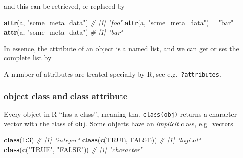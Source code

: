 \documentclass[]{book}
\newenvironment{Shaded}{\begin{snugshade}}{\end{snugshade}}
\newcommand{\CommentTok}[1]{\textcolor[rgb]{0.56,0.35,0.01}{\textit{#1}}}
\newcommand{\DataTypeTok}[1]{\textcolor[rgb]{0.13,0.29,0.53}{#1}}
\newcommand{\DecValTok}[1]{\textcolor[rgb]{0.00,0.00,0.81}{#1}}
\newcommand{\KeywordTok}[1]{\textcolor[rgb]{0.13,0.29,0.53}{\textbf{#1}}}
\newcommand{\NormalTok}[1]{#1}
\newcommand{\OperatorTok}[1]{\textcolor[rgb]{0.81,0.36,0.00}{\textbf{#1}}}
\newcommand{\OtherTok}[1]{\textcolor[rgb]{0.56,0.35,0.01}{#1}}
\newcommand{\StringTok}[1]{\textcolor[rgb]{0.31,0.60,0.02}{#1}}
\begin{document}
and this can be retrieved, or replaced by

\begin{Shaded}
\begin{Highlighting}[]
\KeywordTok{attr}\NormalTok{(a, }\StringTok{"some_meta_data"}\NormalTok{)}
\CommentTok{# [1] "foo"}
\KeywordTok{attr}\NormalTok{(a, }\StringTok{"some_meta_data"}\NormalTok{) =}\StringTok{ "bar"}
\KeywordTok{attr}\NormalTok{(a, }\StringTok{"some_meta_data"}\NormalTok{)}
\CommentTok{# [1] "bar"}
\end{Highlighting}
\end{Shaded}

In essence, the attribute of an object is a named list, and we can
get or set the complete list by

\begin{Shaded}
\end{Shaded}

A number of attributes are treated specially by R, see e.g.~\texttt{?attributes}.

\hypertarget{object-class-and-class-attribute}{%
\subsubsection*{object class and class attribute}\label{object-class-and-class-attribute}}

Every object in R ``has a class'', meaning that \texttt{class(obj)} returns
a character vector with the class of \texttt{obj}. Some objects have
an \emph{implicit} class, e.g.~vectors

\begin{Shaded}
\begin{Highlighting}[]
\KeywordTok{class}\NormalTok{(}\DecValTok{1}\OperatorTok{:}\DecValTok{3}\NormalTok{)}
\CommentTok{# [1] "integer"}
\KeywordTok{class}\NormalTok{(}\KeywordTok{c}\NormalTok{(}\OtherTok{TRUE}\NormalTok{, }\OtherTok{FALSE}\NormalTok{))}
\CommentTok{# [1] "logical"}
\KeywordTok{class}\NormalTok{(}\KeywordTok{c}\NormalTok{(}\StringTok{"TRUE"}\NormalTok{, }\StringTok{"FALSE"}\NormalTok{))}
\CommentTok{# [1] "character"}
\end{Highlighting}
\end{Shaded}
\end{document}
